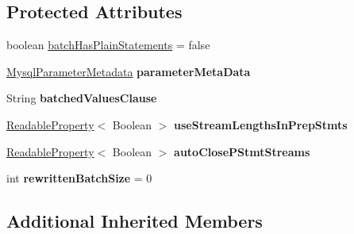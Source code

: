 \subsection*{Protected Attributes}
\begin{DoxyCompactItemize}
\item 
boolean \mbox{\hyperlink{classcom_1_1mysql_1_1cj_1_1jdbc_1_1_client_prepared_statement_a81277367ad12df00619e0926617c0b7b}{batch\+Has\+Plain\+Statements}} = false
\item 
\mbox{\label{classcom_1_1mysql_1_1cj_1_1jdbc_1_1_client_prepared_statement_ad690e30c46689f85c53a246f76645a93}} 
\mbox{\hyperlink{classcom_1_1mysql_1_1cj_1_1jdbc_1_1_mysql_parameter_metadata}{Mysql\+Parameter\+Metadata}} {\bfseries parameter\+Meta\+Data}
\item 
\mbox{\label{classcom_1_1mysql_1_1cj_1_1jdbc_1_1_client_prepared_statement_a2ac3bfcd6c8f2c82fcf7aaca644433f5}} 
String {\bfseries batched\+Values\+Clause}
\item 
\mbox{\label{classcom_1_1mysql_1_1cj_1_1jdbc_1_1_client_prepared_statement_a00359b8d110b9dd194f472b773266ffc}} 
\mbox{\hyperlink{interfacecom_1_1mysql_1_1cj_1_1conf_1_1_readable_property}{Readable\+Property}}$<$ Boolean $>$ {\bfseries use\+Stream\+Lengths\+In\+Prep\+Stmts}
\item 
\mbox{\label{classcom_1_1mysql_1_1cj_1_1jdbc_1_1_client_prepared_statement_a0aaf9a0405cc59b73d21ed48d47f9db1}} 
\mbox{\hyperlink{interfacecom_1_1mysql_1_1cj_1_1conf_1_1_readable_property}{Readable\+Property}}$<$ Boolean $>$ {\bfseries auto\+Close\+P\+Stmt\+Streams}
\item 
\mbox{\label{classcom_1_1mysql_1_1cj_1_1jdbc_1_1_client_prepared_statement_acceed2626ed15be5e1d6b7202a92914e}} 
int {\bfseries rewritten\+Batch\+Size} = 0
\end{DoxyCompactItemize}
\subsection*{Additional Inherited Members}


